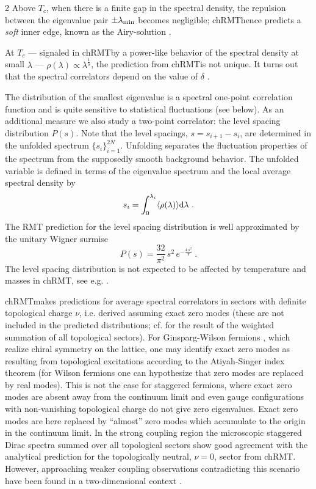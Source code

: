 \begin{multicols}{2}
Above $T_c$, when there is a finite gap in  the spectral density, the
repulsion between the eigenvalue pair $\pm\lambda_{\rm min}$ becomes
negligible; chRMT\space hence predicts a {\em soft} inner edge, known as the
Airy-solution  \cite{Fo93,TrWi94}.

At $T_c$ --- signaled in chRMT\space by a power-like behavior of  the spectral
density at small $\lambda$ --- $\rho(\lambda) \propto
\lambda^{\frac{1}{\delta}}$, the prediction from chRMT\space is not unique. It
turns out that the spectral correlators depend on the value of $\delta$
\cite{AkDaMa98}.  

The distribution of the smallest eigenvalue is a spectral one-point
correlation function and is quite sensitive to statistical fluctuations (see
below). As an additional measure we also study a two-point correlator: the
level spacing distribution $P(s)$.  Note that the level spacings, 
$s=s_{i+1}-s_i$, are determined in the unfolded spectrum $\{s_i\}_{i=1}^{2N}$.
Unfolding separates the fluctuation properties of the spectrum from the
supposedly smooth background behavior. The unfolded variable is defined in
terms of the eigenvalue spectrum and the local average spectral density by 
\begin{equation}
s_i=\int_{0}^{\lambda_i}\langle\rho(\lambda)\rangle{\rm d}\lambda \ .
\label{defUnf}
\end{equation}
The RMT prediction for the level spacing distribution is well approximated by
the unitary Wigner surmise
\begin{equation}
P(s)=\frac{32}{\pi^2}\,s^2\,e^{-\frac{4\,s^2}{\pi}} \ .
\label{WUE}
\end{equation}
The level spacing distribution is not expected to be affected by temperature 
and masses in chRMT, see e.g. \cite{PuRaWe98}.

chRMT\space makes predictions for average spectral correlators in sectors with
definite topological charge $\nu$, i.e. derived assuming exact zero modes
(these are not included in the  predicted  distributions; cf.
\cite{Da99} for the result of the weighted summation of all topological
sectors). For Ginsparg-Wilson fermions \cite{GiWi82},  which realize chiral
symmetry on the lattice, one may identify exact zero modes as resulting from
topological excitations according to the Atiyah-Singer index theorem (for
Wilson fermions one can hypothesize that zero modes are replaced by real
modes). This is not the case for staggered fermions, where exact zero  modes
are absent away from the continuum limit \cite{SmVi87} and even gauge
configurations with non-vanishing topological charge do not give zero
eigenvalues. Exact zero modes are here  replaced by ``almost'' zero modes which
accumulate to the origin  in the continuum limit. In the strong coupling region
the microscopic staggered Dirac spectra summed over all topological sectors
show \cite{DaHeNi99,BeMeWe98} good agreement with the analytical  prediction
for the topologically neutral, $\nu=0$, sector from chRMT.  However,
approaching weaker coupling observations contradicting this scenario have been
found in a two-dimensional context \cite{FaHiLa99}.


\end{multicols}

